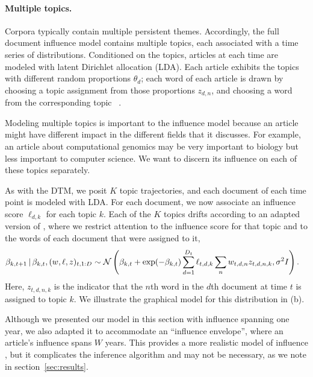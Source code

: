 \paragraph{Multiple topics.}  Corpora typically contain multiple
persistent themes.  Accordingly, the full document influence model contains
multiple topics, each associated with a time series of distributions.
Conditioned on the topics, articles at each time are modeled
with latent Dirichlet allocation (LDA).  Each article exhibits the
topics with different random proportions $\theta_d$; each word of each
article is drawn by choosing a topic assignment from those proportions
$z_{d,n}$, and choosing a word from the corresponding topic
~\citep{blei:2003}.

Modeling multiple topics is important to the influence model because
an article might have different impact in the different fields that it
discusses.  For example, an article about computational genomics may
be very important to biology but less important to computer science.
We want to discern its influence on each of these topics separately.

As with the DTM, we posit $K$ topic trajectories, and each document of
each time point is modeled with LDA.  For each document, we now
associate an influence score $\ell_{d,k}$ for each topic $k$.  Each of
the $K$ topics drifts according to an adapted version of
, where we restrict attention to the influence
score for that topic and to the words of each document that were
assigned to it,
\begin{equation}
  \begin{split}
    \label{eq:logistic-normal-influence-topics}
    \beta_{k,t+1} & \, | \, \beta_{k,t}, (w, \ell, z)_{t,1:D} \sim
    \mathcal{N}\left(
      \beta_{k,t} +
      \exp(-\beta_{k,t}) \sum_{d=1}^{D_t} \ell_{t,d,k} \sum_n w_{t,d,n} z_{t,d,n,k},
      \sigma^2 I
    \right).
  \end{split}
\end{equation}
Here, $z_{t,d,n,k}$ is the indicator that the $n$th word in the $d$th
document at time $t$ is assigned to topic $k$.  We illustrate the
graphical model for this distribution in  (b).

Although we presented our model in this section with influence
spanning one year, we also adapted it to accommodate an ``influence
envelope'', where an article's influence spans $W$ years.  This
provides a more realistic model of influence \citep{porter:2005}, but
it complicates the inference algorithm and may not be necessary, as we
note in section~\ref{sec:results}.

